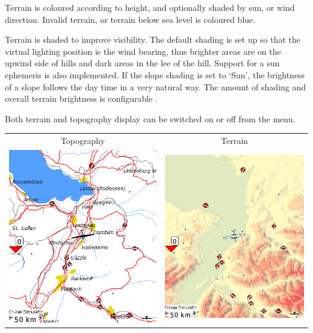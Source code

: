 Terrain is coloured according to height, and optionally shaded by sun, or
wind direction.  Invalid terrain, or terrain below
sea level is coloured blue.


Terrain is shaded to improve visibility.  The default shading
is set up so that the virtual lighting position is the wind bearing,
thus brighter areas are on the upwind side of hills and dark areas in
the lee of the hill.
Support for a sun ephemeris is also implemented. If the slope shading is set
to `Sun', the brightness of a slope follows the day time in a very natural way.
The amount of shading and overall terrain brightness is configurable .

Both terrain and topography display can be switched on or off from the
menu.

\begin{tabular}{c c}
Topography & Terrain \\
\includegraphics[angle=0,width=0.4\linewidth,keepaspectratio='true']{figures/cut-topo.png} &
\includegraphics[angle=0,width=0.4\linewidth,keepaspectratio='true']{figures/cut-terrain.png} \\
\end{tabular}

